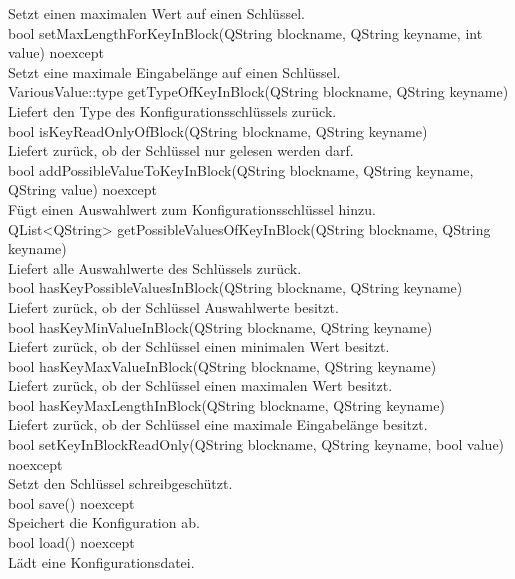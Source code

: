Setzt einen maximalen Wert auf einen Schlüssel.\bigskip \\
\small{bool setMaxLengthForKeyInBlock(QString blockname, QString keyname, int value) noexcept}\\
Setzt eine maximale Eingabelänge auf einen Schlüssel.\bigskip \\
\small{VariousValue::type getTypeOfKeyInBlock(QString blockname, QString keyname)}\\
Liefert den Type des Konfigurationsschlüssels zurück.\bigskip \\
\small{bool isKeyReadOnlyOfBlock(QString blockname, QString keyname)}\\
Liefert zurück, ob der Schlüssel nur gelesen werden darf.\bigskip \\
\small{bool addPossibleValueToKeyInBlock(QString blockname, QString keyname, QString value) noexcept}\\
Fügt einen Auswahlwert zum Konfigurationsschlüssel hinzu.\bigskip \\
\small{QList<QString> getPossibleValuesOfKeyInBlock(QString blockname, QString keyname)}\\
Liefert alle Auswahlwerte des Schlüssels zurück.\bigskip \\
\small{bool hasKeyPossibleValuesInBlock(QString blockname, QString keyname)}\\
Liefert zurück, ob der Schlüssel Auswahlwerte besitzt.\bigskip \\
\small{bool hasKeyMinValueInBlock(QString blockname, QString keyname)}\\
Liefert zurück, ob der Schlüssel einen minimalen Wert besitzt.\\		
\small{bool hasKeyMaxValueInBlock(QString blockname, QString keyname)}\\
Liefert zurück, ob der Schlüssel einen maximalen Wert besitzt.\\
\small{bool hasKeyMaxLengthInBlock(QString blockname, QString keyname)}\\
Liefert zurück, ob der Schlüssel eine maximale Eingabelänge besitzt.\bigskip \\	
\small{bool setKeyInBlockReadOnly(QString blockname, QString keyname, bool value) noexcept}\\
Setzt den Schlüssel schreibgeschützt.\bigskip \\
\small{bool save() noexcept}\\
Speichert die Konfiguration ab.\bigskip \\
\small{bool load() noexcept}\\
Lädt eine Konfigurationsdatei.

